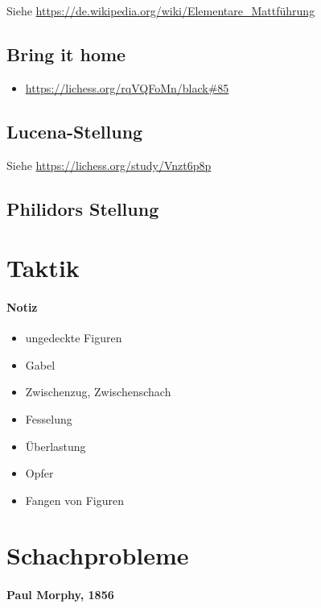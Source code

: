 \documentclass[
  a4paper,
  justified,
  nobib,
]{tufte-handout}
\newenvironment{notiz}{
  \color{Maroon}
  \paragraph*{Notiz}
}{
  \color{black}
}
\begin{document}
Siehe \url{https://de.wikipedia.org/wiki/Elementare_Mattführung}

\subsection{Bring it home}%
\label{sub:bring_it_home}

\begin{itemize}
  \item \url{https://lichess.org/rqVQFoMn/black#85}
\end{itemize}

\subsection{Lucena-Stellung}%
\label{sub:lucena_stellung}

Siehe \url{https://lichess.org/study/Vnzt6p8p}

\subsection{Philidors Stellung}%
\label{sub:philidors_stellung}

\section{Taktik}%
\label{sec:taktik}

\begin{notiz}
  \begin{itemize}
    \item ungedeckte Figuren
    \item Gabel
    \item Zwischenzug, Zwischenschach
    \item Fesselung
    \item Überlastung
    \item Opfer
    \item Fangen von Figuren
  \end{itemize}
\end{notiz}

\section{Schachprobleme}%
\label{sec:schachprobleme}

\paragraph{Paul Morphy, 1856}%
\end{document}
